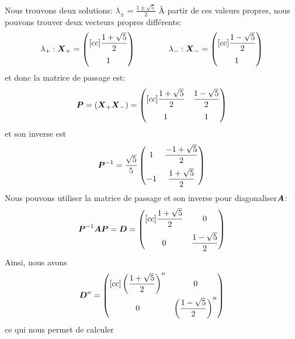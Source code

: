 Nous trouvons deux solutions: $\lambda_\pm = \displaystyle\frac{1\pm \sqrt{5}}{2}$
À partir de ces valeurs propres, nous pouvons trouver deux vecteurs propres différents:
\[
\lambda_+ : \boldsymbol{X}_+ = \begin{pmatrix}[cc]
\displaystyle \frac{1+ \sqrt{5}}{2} \\[10pt]
1
\end{pmatrix}
\qquad\qquad\lambda_- : \boldsymbol{X}_- = \begin{pmatrix}[cc]
\displaystyle \frac{1- \sqrt{5}}{2} \\[10pt]
1
\end{pmatrix}
\]
et donc la matrice de passage est:
\[
\boldsymbol{P} = (\boldsymbol{X}_+ \boldsymbol{X}_-) = 
\begin{pmatrix}[cc]
\displaystyle \frac{1+ \sqrt{5}}{2} & \displaystyle \frac{1- \sqrt{5}}{2} \\[10pt]
1 & 1
\end{pmatrix}
\]
et son inverse est
\[
\boldsymbol{P}^{-1} = \frac{\sqrt{5}}{5}\begin{pmatrix}
1 & \displaystyle \frac{-1+ \sqrt{5}}{2} \\[10pt]
-1 & \displaystyle \frac{1+ \sqrt{5}}{2}
\end{pmatrix}
\]
Nous pouvons utiliser la matrice de passage et son inverse pour diagonaliser$\boldsymbol{A}$:
\[
\boldsymbol{P}^{-1}\boldsymbol{A}\boldsymbol{P} = \boldsymbol{D} = \begin{pmatrix}[cc]
\displaystyle \frac{1+ \sqrt{5}}{2} & 0 \\[10pt]
0 & \displaystyle \frac{1 -\sqrt{5}}{2}
\end{pmatrix}
\]
Ainsi, nous avons
\[
\boldsymbol{D}^n = 
\begin{pmatrix}[cc]
\displaystyle \left(\frac{1+ \sqrt{5}}{2}\right)^n & 0 \\[10pt]
0 & \left(\displaystyle \frac{1 -\sqrt{5}}{2}\right)^n
\end{pmatrix}
\]
ce qui nous permet de calculer
